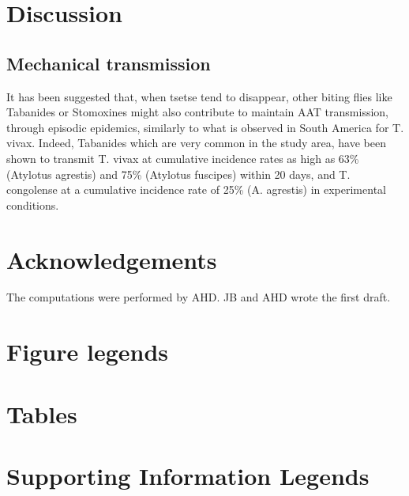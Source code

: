 \documentclass[10pt]{article}
\begin{document}
\section*{Discussion}
\label{unnumbered-14}
\subsection*{Mechanical transmission}
\label{unnumbered-15}
It has been suggested that, when tsetse tend to disappear, other biting flies like Tabanides or Stomoxines might also contribute to maintain AAT transmission, 
through episodic epidemics, similarly to what is observed in South America for T. vivax. 
Indeed, Tabanides which are very common in the study area, have been shown to transmit T. vivax at cumulative incidence rates as high as 63\% (Atylotus agrestis) and 75\% (Atylotus fuscipes) within 20 days, and T. congolense at a cumulative incidence rate of 25\% (A. agrestis) 
in experimental conditions. 

\section*{Acknowledgements}
\label{unnumbered-16}
The computations were performed by AHD.
JB and AHD wrote the first draft.



\section*{Figure legends}
\label{unnumbered-17}
\section*{Tables}
\label{unnumbered-18}
\section*{Supporting Information Legends}
\label{unnumbered-19}
\end{document}
